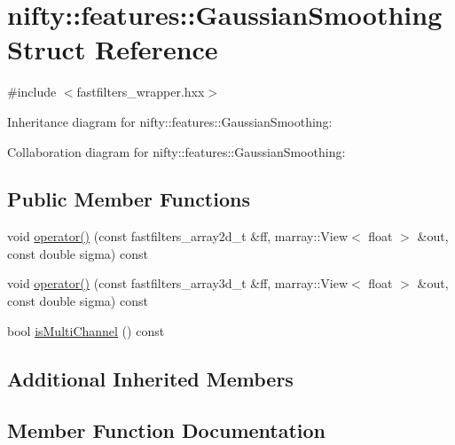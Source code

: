 \hypertarget{structnifty_1_1features_1_1GaussianSmoothing}{}\section{nifty\+:\+:features\+:\+:Gaussian\+Smoothing Struct Reference}
\label{structnifty_1_1features_1_1GaussianSmoothing}


{\ttfamily \#include $<$fastfilters\+\_\+wrapper.\+hxx$>$}



Inheritance diagram for nifty\+:\+:features\+:\+:Gaussian\+Smoothing\+:


Collaboration diagram for nifty\+:\+:features\+:\+:Gaussian\+Smoothing\+:
\subsection*{Public Member Functions}
\begin{DoxyCompactItemize}
\item 
void \hyperlink{structnifty_1_1features_1_1GaussianSmoothing_a670a26946515c1493170fdc2d74d195c}{operator()} (const fastfilters\+\_\+array2d\+\_\+t \&ff, marray\+::\+View$<$ float $>$ \&out, const double sigma) const 
\item 
void \hyperlink{structnifty_1_1features_1_1GaussianSmoothing_a33943d63b7580ee180bda1e4b379773b}{operator()} (const fastfilters\+\_\+array3d\+\_\+t \&ff, marray\+::\+View$<$ float $>$ \&out, const double sigma) const 
\item 
bool \hyperlink{structnifty_1_1features_1_1GaussianSmoothing_a6b759af61a2d8914140565c7bf418f0b}{is\+Multi\+Channel} () const 
\end{DoxyCompactItemize}
\subsection*{Additional Inherited Members}


\subsection{Member Function Documentation}
\hypertarget{structnifty_1_1features_1_1GaussianSmoothing_a6b759af61a2d8914140565c7bf418f0b}{}
